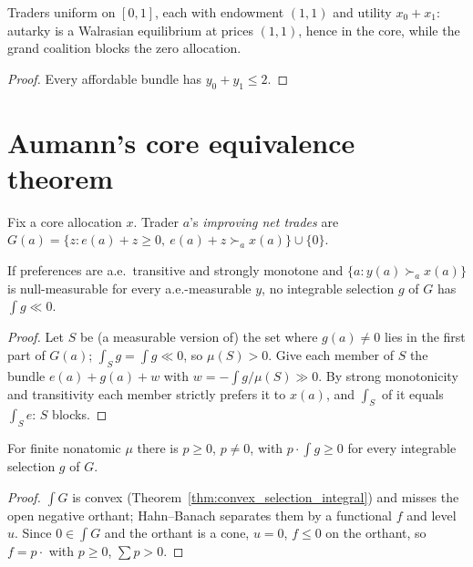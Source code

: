 \begin{theorem}
\label{thm:continuum_witness}
\leanok
{}
Traders uniform on $[0,1]$, each with endowment $(1,1)$ and utility $x_0 + x_1$: autarky is a Walrasian equilibrium at
prices $(1,1)$, hence in the core, while the grand coalition blocks the zero allocation.
\end{theorem}
\begin{proof}
\leanok
Every affordable bundle has $y_0 + y_1 \le 2$.
\end{proof}


\section{Aumann's core equivalence theorem}
\label{sec:aumann_core}

Fix a core allocation $x$. Trader $a$'s \emph{improving net trades} are
$G(a) = \{z : e(a) + z \ge 0,\ e(a) + z \succ_a x(a)\} \cup \{0\}$.

\begin{lemma}
\label{lem:aumann_no_neg}
\leanok
{}
If preferences are a.e.\ transitive and strongly monotone and $\{a : y(a) \succ_a x(a)\}$ is null-measurable for every
a.e.-measurable $y$, no integrable selection $g$ of $G$ has $\int g \ll 0$.
\end{lemma}
\begin{proof}
\leanok
Let $S$ be (a measurable version of) the set where $g(a) \ne 0$ lies in the first part of $G(a)$; $\int_S g = \int g \ll 0$,
so $\mu(S) > 0$. Give each member of $S$ the bundle $e(a) + g(a) + w$ with $w = -\int g / \mu(S) \gg 0$. By strong
monotonicity and transitivity each member strictly prefers it to $x(a)$, and $\int_S$ of it equals $\int_S e$: $S$ blocks.
\end{proof}

\begin{lemma}
\label{lem:aumann_price}
\leanok
{}
For finite nonatomic $\mu$ there is $p \ge 0$, $p \ne 0$, with $p \cdot \int g \ge 0$ for every integrable selection $g$ of
$G$.
\end{lemma}
\begin{proof}
\leanok
$\int G$ is convex (Theorem~\ref{thm:convex_selection_integral}) and misses the open negative orthant; Hahn--Banach separates
them by a functional $f$ and level $u$. Since $0 \in \int G$ and the orthant is a cone, $u = 0$, $f \le 0$ on the orthant,
so $f = p \cdot$ with $p \ge 0$, $\sum p > 0$.
\end{proof}

